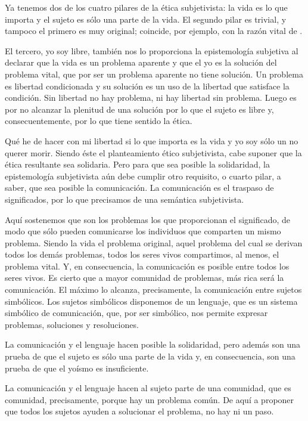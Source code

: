 Ya tenemos dos de los cuatro pilares de la ética subjetivista: la vida es lo
que importa y el sujeto es sólo una parte de la vida. El segundo pilar es
trivial, y tampoco el primero es muy original; coincide, por ejemplo, con la
razón vital de \cite{Ortega1914}.

\goodpage

El tercero, yo soy libre, también nos lo proporciona la epistemología
subjetiva al declarar que la vida es un problema aparente y que el yo es la
solución del problema vital, que por ser un problema aparente no tiene
solución. Un problema es libertad condicionada y su solución es un uso de la
libertad que satisface la condición. Sin libertad no hay problema, ni hay
libertad sin problema. Luego es por no alcanzar la plenitud de una solución
por lo que el sujeto es libre y, consecuentemente, por lo que tiene sentido
la ética.

Qué he de hacer con mi libertad si lo que importa es la vida y yo soy sólo
un no querer morir. Siendo éste el planteamiento ético subjetivista, cabe
suponer que la ética resultante sea solidaria. Pero para que sea posible la
solidaridad, la epistemología subjetivista aún debe cumplir otro requisito,
o cuarto pilar, a saber, que sea posible la comunicación. La comunicación es
el traspaso de significados, por lo que precisamos de una semántica
subjetivista.

Aquí sostenemos que son los problemas los que proporcionan el significado,
de modo que sólo pueden comunicarse los individuos que comparten un mismo
problema. Siendo la vida el problema original, aquel problema del cual se
derivan todos los demás problemas, todos los seres vivos compartimos, al
menos, el problema vital. Y, en consecuencia, la comunicación es posible
entre todos los seres vivos. Es cierto que a mayor comunidad de problemas,
más rica será la comunicación. El máximo lo alcanza, precisamente, la
comunicación entre sujetos simbólicos. Los sujetos simbólicos disponemos de
un lenguaje, que es un sistema simbólico de comunicación, que, por ser
simbólico, nos permite expresar problemas, soluciones y resoluciones.

La comunicación y el lenguaje hacen posible la solidaridad, pero además son
una prueba de que el sujeto es sólo una parte de la vida y, en consecuencia,
son una prueba de que el yoísmo es insuficiente.

La comunicación y el lenguaje hacen al sujeto parte de una comunidad, que es
comunidad, precisamente, porque hay un problema común. De aquí a proponer
que todos los sujetos ayuden a solucionar el problema, no hay ni un paso.

